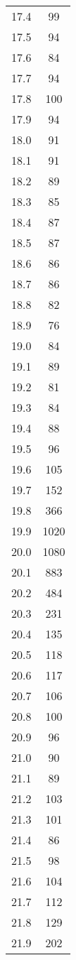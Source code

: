 \begin{tabular}{S[table-format=2.1]S[table-format=4.0]}
		17.4 &   99 \\
		17.5 &   94 \\
		17.6 &   84 \\
		17.7 &   94 \\
		17.8 &  100 \\
		17.9 &   94 \\
		18.0 &   91 \\
		18.1 &   91 \\
		18.2 &   89 \\
		18.3 &   85 \\
		18.4 &   87 \\
		18.5 &   87 \\
		18.6 &   86 \\
		18.7 &   86 \\
		18.8 &   82 \\
		18.9 &   76 \\
		19.0 &   84 \\
		19.1 &   89 \\
		19.2 &   81 \\
		19.3 &   84 \\
		19.4 &   88 \\
		19.5 &   96 \\
		19.6 &  105 \\
		19.7 &  152 \\
		19.8 &  366 \\
		19.9 & 1020 \\
		20.0 & 1080 \\
		20.1 &  883 \\
		20.2 &  484 \\
		20.3 &  231 \\
		20.4 &  135 \\
		20.5 &  118 \\
		20.6 &  117 \\
		20.7 &  106 \\
		20.8 &  100 \\
		20.9 &   96 \\
		21.0 &   90 \\
		21.1 &   89 \\
		21.2 &  103 \\
		21.3 &  101 \\
		21.4 &   86 \\
		21.5 &   98 \\
		21.6 &  104 \\
		21.7 &  112 \\
		21.8 &  129 \\
		21.9 &  202 \\

\end{tabular}
